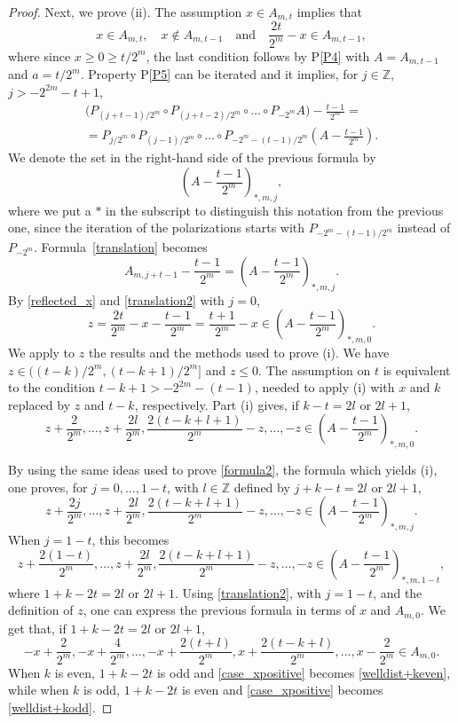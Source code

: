\documentclass[12pt,reqno]{amsart}
\newcommand{\Z}{{\mathbb Z}}
\numberwithin{equation}{section}
\begin{document}
\begin{proof}
Next, we prove (ii).  The assumption $x\in A_{m,t}$ implies that
\begin{equation}\label{reflected_x}
 x\in A_{m,t},\quad x\notin A_{m,t-1} \quad\text{and}\quad \frac{2t}{2^m}-x\in A_{m,t-1},
\end{equation}
where since $x\ge 0\ge t/2^m$, the last condition follows by P\ref{P4} with $A=A_{m,t-1}$ and $a=t/2^m$.
Property P\ref{P5} can be iterated and it implies, for $j\in\Z$,  $j>-2^{2m}-t+1$,
\begin{multline}\label{translation}
\big(P_{(j+t-1)/{2^m}}\circ P_{(j+t-2)/{2^m}}\circ \dots\circ P_{-2^m} A\big)-\frac{t-1}{2^m}=\\
=P_{j/2^m}\circ P_{(j-1)/2^m}\circ\dots\circ P_{-2^m-(t-1)/2^m}\left(A-\frac{t-1}{2^m}\right).
\end{multline}
We denote  the set in the right-hand side of the previous formula by
\[
 \left(A-\frac{t-1}{2^m}\right)_{*,m,j},
\]
where we put a $*$ in the subscript to distinguish this notation from the previous one, since the iteration of the polarizations starts with $P_{-2^m-(t-1)/2^m}$ instead of $P_{-2^m}$. Formula~\eqref{translation} becomes
\begin{equation}\label{translation2}
A_{m,j+t-1}-\frac{t-1}{2^m}=\left(A-\frac{t-1}{2^m}\right)_{*,m,j}.
\end{equation}
By \eqref{reflected_x} and \eqref{translation2} with $j=0$,
\[
z=\frac{2t}{2^m}-x-\frac{t-1}{2^m}=\frac{t+1}{2^m}-x\in\left(A-\frac{t-1}{2^m}\right)_{*,m,0}.
\]
We apply to $z$ the results and the methods used to prove (i). We have $z\in((t-k)/2^m,(t-k+1)/2^m]$ and $z\le 0$. The assumption on $t$  is equivalent to the condition $t-k+1>-2^{2m}-(t-1)$, needed to apply (i) with $x$ and $k$ replaced by $z$ and $t-k$, respectively. Part (i) gives, if $k-t=2l$ or $2l+1$,
$$
 z+\frac{2}{2^m},\dots,z+\frac{2l}{2^m},
 \frac{2(t-k+l+1)}{2^m}-z, \dots,  -z \in \left(A-\frac{t-1}{2^m}\right)_{*,m,0}.
$$

By using the same ideas used to prove \eqref{formula2}, the formula which yields (i), one proves, for $j=0,\dots,1-t$, with $l\in\Z$ defined by $j+k-t=2l$ or $2l+1$,
$$
 z+\frac{2j}{2^m},\dots,z+\frac{2l}{2^m},
 \frac{2(t-k+l+1)}{2^m}-z, \dots,  -z \in \left(A-\frac{t-1}{2^m}\right)_{*,m,j}.
$$
When $j=1-t$, this becomes
$$
 z+\frac{2(1-t)}{2^m},\dots,z+\frac{2l}{2^m},
 \frac{2(t-k+l+1)}{2^m}-z, \dots,  -z \in \left(A-\frac{t-1}{2^m}\right)_{*,m,1-t},
$$
where $1+k-2t=2l$ or $2l+1$.
Using \eqref{translation2}, with $j=1-t$,  and the definition of $z$, one can express the previous formula in terms of $x$ and $A_{m,0}$. We get that, if $1+k-2t=2l$ or $2l+1$,
\begin{equation}\label{case_xpositive}
 -x+\frac{2}{2^m},-x+\frac{4}{2^m},\dots,-x+\frac{2(t+l)}{2^m},
 x+\frac{2(t-k+l)}{2^m}, \dots,  x-\frac2{2^m} \in A_{m,0}.
\end{equation}
When $k$ is even, $1+k-2t$ is odd and \eqref{case_xpositive} becomes \eqref{welldist+keven}, while when $k$ is odd, $1+k-2t$ is even and \eqref{case_xpositive} becomes \eqref{welldist+kodd}.
\end{proof}
\end{document}
